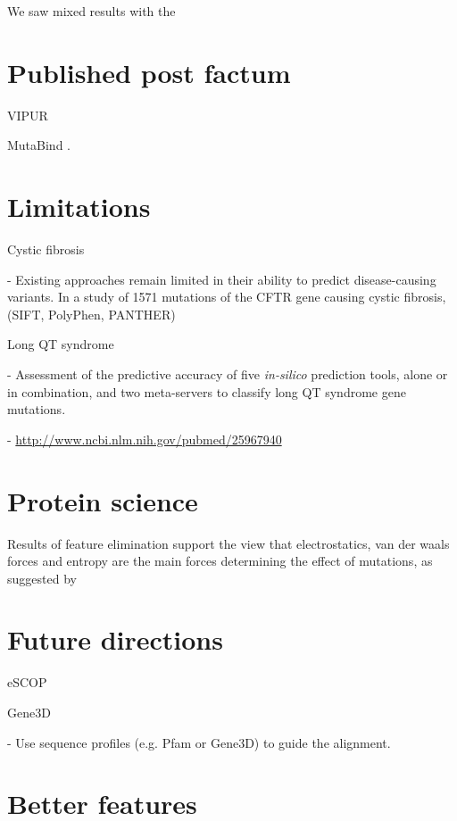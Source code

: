 
 \label{chap:discussion}

We saw mixed results with the


\section{Published post factum}


VIPUR \cite{baugh_robust_2016}


MutaBind \cite{li_mutabind_2016}.


\section{Limitations}

Cystic fibrosis

  - Existing approaches remain limited in their ability to predict disease-causing variants. In a study of 1571 mutations of the CFTR gene causing cystic fibrosis, (SIFT, PolyPhen, PANTHER) \cite{dorfman_common_2010}

Long QT syndrome

  - Assessment of the predictive accuracy of five \textit{in-silico} prediction tools, alone or in combination, and two meta-servers to classify long QT syndrome gene mutations.

  - \url{http://www.ncbi.nlm.nih.gov/pubmed/25967940}


\section{Protein science}

Results of feature elimination support the view that electrostatics, van der waals forces and entropy are the main forces determining the effect of mutations, as suggested by


\section{Future directions}


eSCOP

Gene3D

- Use sequence profiles (e.g. Pfam or Gene3D) to guide the alignment.


\section{Better features}

